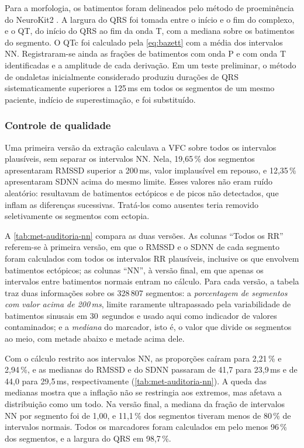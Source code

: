 Para a morfologia, os batimentos foram delineados pelo método de
proeminência do NeuroKit2 \cite{emrich2024}. A largura do QRS foi tomada
entre o início e o fim do complexo, e o QT, do início do QRS ao fim da onda
T, com a mediana sobre os batimentos do segmento. O QTc foi calculado pela
\autoref{eq:bazett} com a média dos intervalos NN. Registraram-se ainda as
frações de batimentos com onda P e com onda T identificadas e a amplitude
de cada derivação. Em um teste preliminar, o método de ondaletas
inicialmente considerado produziu durações de QRS sistematicamente
superiores a 125\,ms em todos os segmentos de um mesmo paciente, indício de
superestimação, e foi substituído.

\subsubsection{Controle de qualidade}

Uma primeira versão da extração calculava a \gls{VFC} sobre todos os
intervalos plausíveis, sem separar os intervalos NN. Nela, 19,65\,\% dos
segmentos apresentaram RMSSD superior a 200\,ms, valor implausível em
repouso, e 12,35\,\% apresentaram SDNN acima do mesmo limite. Esses valores
não eram ruído aleatório: resultavam de batimentos ectópicos e de picos não
detectados, que inflam as diferenças sucessivas. Tratá-los como ausentes
teria removido seletivamente os segmentos com ectopia.

A \autoref{tab:met-auditoria-nn} compara as duas versões. As colunas
``Todos os RR'' referem-se à primeira versão, em que o RMSSD e o SDNN de
cada segmento foram calculados com todos os intervalos RR plausíveis,
inclusive os que envolvem batimentos ectópicos; as colunas ``NN'', à versão
final, em que apenas os intervalos entre batimentos normais entram no
cálculo. Para cada versão, a tabela traz duas informações sobre os 328\,807
segmentos: a \textit{porcentagem de segmentos com valor acima de 200\,ms},
limite raramente ultrapassado pela variabilidade de batimentos sinusais em
30~segundos e usado aqui como indicador de valores contaminados; e a
\textit{mediana} do marcador, isto é, o valor que divide os segmentos ao
meio, com metade abaixo e metade acima dele.

Com o cálculo restrito aos intervalos NN, as proporções caíram para
2,21\,\% e 2,94\,\%, e as medianas do RMSSD e do SDNN passaram de 41,7 para
23,9\,ms e de 44,0 para 29,5\,ms, respectivamente
(\autoref{tab:met-auditoria-nn}). A queda das medianas mostra que a
inflação não se restringia aos extremos, mas afetava a distribuição como um
todo. Na versão final, a mediana da fração de intervalos NN por segmento foi
de 1,00, e 11,1\,\% dos segmentos tiveram menos de 80\,\% de intervalos
normais. Todos os marcadores foram calculados em pelo menos 96\,\% dos
segmentos, e a largura do QRS em 98,7\,\%.


